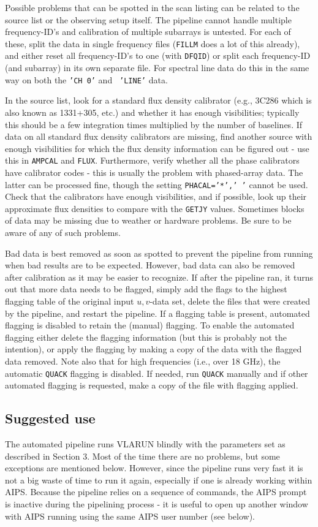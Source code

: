 Possible problems that can be spotted in the scan listing can be
related to the source list or the observing setup itself. The pipeline
cannot handle multiple frequency-ID's and calibration of multiple
subarrays is untested. For each of these, split the data in single
frequency files ({\tt FILLM} does a lot of this already), and either
reset all frequency-ID's to one (with {\tt DFQID}) or split each
frequency-ID (and subarray) in its own separate file. For spectral
line data do this in the same way on both the {\tt 'CH 0'} and {\tt
'LINE'} data.

In the source list, look for a standard flux density calibrator (e.g.,
3C286 which is also known as 1331+305, etc.) and whether it has enough
visibilities; typically this should be a few integration times
multiplied by the number of baselines. If data on all standard flux
density calibrators are missing, find another source with enough
visibilities for which the flux density information can be figured out
- use this in {\tt AMPCAL} and {\tt FLUX}. Furthermore, verify
whether all the phase calibrators have calibrator codes - this is
usually the problem with phased-array data. The latter can be
processed fine, though the setting {\tt PHACAL='*','~'} cannot
be used. Check that the calibrators have enough visibilities, and if
possible, look up their approximate flux densities to compare with the
{\tt GETJY} values. Sometimes blocks of data may be missing due to
weather or hardware problems. Be sure to be aware of any of such
problems.

Bad data is best removed as soon as spotted to prevent the pipeline from
running when bad results are to be expected. However, bad data can also
be removed after calibration as it may be easier to recognize. If
after the pipeline ran, it turns out that more data needs to be
flagged, simply add the flags to the highest flagging table of the
original input $u,v$-data set, delete the files that were created by
the pipeline, and restart the pipeline. If a flagging table is
present, automated flagging is disabled to retain the (manual)
flagging. To enable the automated flagging either delete the flagging
information (but this is probably not the intention), or apply the
flagging by making a copy of the data with the flagged data
removed. Note also that for high frequencies (i.e., over 18 GHz), the
automatic {\tt QUACK} flagging is disabled. If needed, run {\tt QUACK}
manually and if other automated flagging is requested, make a copy of
the file with flagging applied.

\subsection{Suggested use}
The automated pipeline runs VLARUN blindly with the parameters set as
described in Section 3. Most of the time there are no
problems, but some exceptions are mentioned below. However, since the
pipeline runs very fast it is not a big waste of time to run it again,
especially if one is already working within AIPS. Because the pipeline
relies on a sequence of commands, the AIPS prompt is inactive during
the pipelining process - it is useful to open up another window with
AIPS running using the same AIPS user number (see below).

